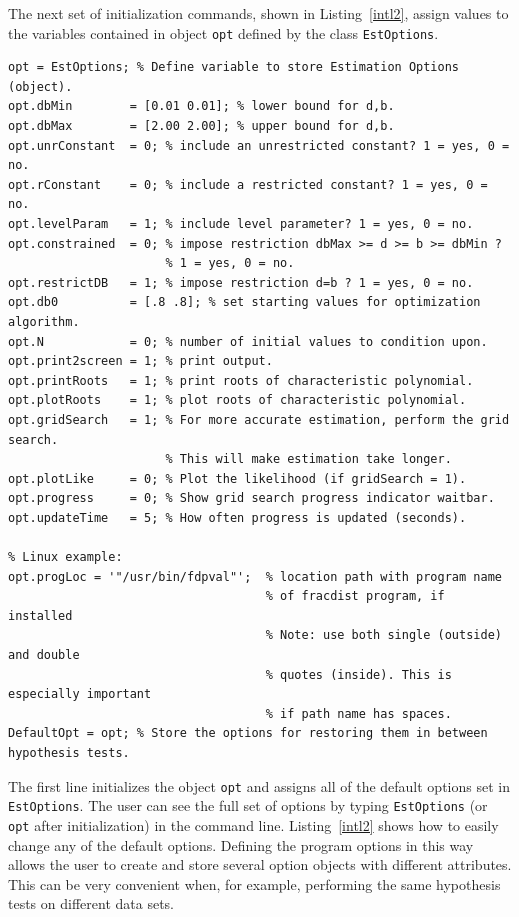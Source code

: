 \documentclass[10pt]{article}
\begin{document}
The next set of initialization commands, shown in Listing~\ref{intl2}, assign values to the variables contained in object \verb|opt| defined by the class \verb|EstOptions|. 

\begin{lstlisting}[frame=single,caption={Choosing estimation options}, label = intl2]
% -------- Choosing estimation options ----------%
opt = EstOptions; % Define variable to store Estimation Options (object).
opt.dbMin        = [0.01 0.01]; % lower bound for d,b.
opt.dbMax        = [2.00 2.00]; % upper bound for d,b.
opt.unrConstant  = 0; % include an unrestricted constant? 1 = yes, 0 = no.
opt.rConstant    = 0; % include a restricted constant? 1 = yes, 0 = no.
opt.levelParam   = 1; % include level parameter? 1 = yes, 0 = no.
opt.constrained  = 0; % impose restriction dbMax >= d >= b >= dbMin ? 
                      % 1 = yes, 0 = no.
opt.restrictDB   = 1; % impose restriction d=b ? 1 = yes, 0 = no.
opt.db0          = [.8 .8]; % set starting values for optimization algorithm.
opt.N            = 0; % number of initial values to condition upon.
opt.print2screen = 1; % print output.
opt.printRoots   = 1; % print roots of characteristic polynomial.
opt.plotRoots    = 1; % plot roots of characteristic polynomial.
opt.gridSearch   = 1; % For more accurate estimation, perform the grid search.
					  % This will make estimation take longer.
opt.plotLike     = 0; % Plot the likelihood (if gridSearch = 1).
opt.progress 	 = 0; % Show grid search progress indicator waitbar.
opt.updateTime   = 5; % How often progress is updated (seconds).

% Linux example:
opt.progLoc = '"/usr/bin/fdpval"';  % location path with program name 
                                    % of fracdist program, if installed
                                    % Note: use both single (outside) and double 
                                    % quotes (inside). This is especially important 
                                    % if path name has spaces.
DefaultOpt = opt; % Store the options for restoring them in between hypothesis tests.
\end{lstlisting}

The first line initializes the object \verb|opt| and assigns all of the default options set in \verb|EstOptions|. The user can see the full set of options by typing \verb|EstOptions| (or \verb|opt| after initialization) in the command line. Listing~\ref{intl2} shows how to easily change any of the default options. Defining the program options in this way allows the user to create and store several option objects with different attributes. This can be very convenient when, for example, performing the same hypothesis tests on different data sets. 
\end{document}
